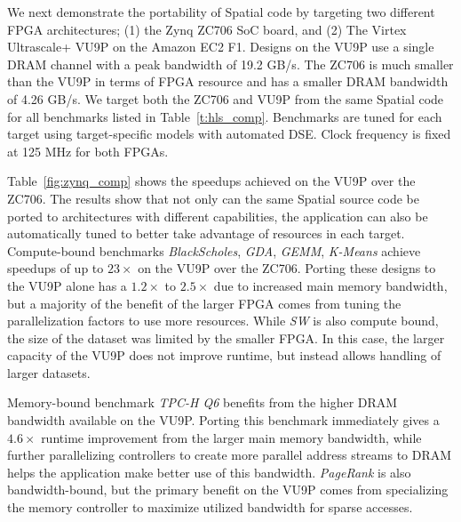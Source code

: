 We next demonstrate the portability of Spatial code by targeting two different FPGA architectures; (1) the Zynq ZC706 SoC board, and (2) The Virtex Ultrascale+ VU9P on the Amazon EC2 F1.
Designs on the VU9P use a single DRAM channel with a peak bandwidth of 19.2 GB/s. The ZC706 is much smaller than the VU9P in terms of FPGA resource and has a smaller DRAM bandwidth of 4.26 GB/s.
We target both the ZC706 and VU9P from the same Spatial code for all benchmarks listed in Table~\ref{t:hls_comp}. Benchmarks are tuned for each target using
target-specific models with automated DSE. Clock frequency is fixed at 125 MHz for both FPGAs. 

Table~\ref{fig:zynq_comp} shows the speedups achieved on the VU9P over the ZC706. The results show that not only can the same Spatial source code be ported
to architectures with different capabilities, the application can also be automatically tuned to better take advantage of resources in each target.
Compute-bound benchmarks \emph{BlackScholes}, \emph{GDA}, \emph{GEMM}, \emph{K-Means} achieve speedups of up to $23\times$ on the VU9P over the ZC706. Porting these designs to the VU9P alone has a $1.2\times$ to $2.5\times$ due to increased main memory bandwidth, but a majority of the benefit of the larger FPGA comes from tuning the parallelization factors to use more resources. 
While \emph{SW} is also compute bound, the size of the dataset was limited by the smaller FPGA. In this case, the larger capacity of the VU9P does not improve runtime, but instead allows handling of larger datasets. 

Memory-bound benchmark \emph{TPC-H Q6} benefits from the higher DRAM bandwidth available on the VU9P. Porting this benchmark immediately gives a $4.6\times$ runtime improvement from the larger main memory bandwidth, while further parallelizing controllers to create more parallel address streams to DRAM helps the application make better use of this bandwidth. \emph{PageRank} is also bandwidth-bound, but the primary benefit on the VU9P comes from specializing the memory controller to maximize utilized bandwidth for sparse accesses.







